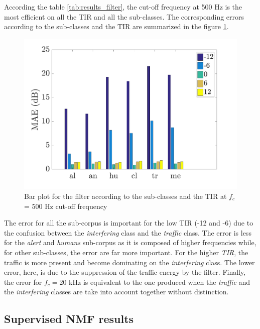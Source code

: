 \documentclass[twocolumn,a4paper,10pt]{article}
\begin{document}
According the table \ref{tab:results_filter}, the cut-off frequency at 500 Hz is the most efficient on all the TIR and all the sub-classes. The corresponding errors according to the sub-classes and the TIR are summarized in the figure \ref{fig:filterAmbiance}.\\

\begin{figure}[hbtp]
\centering
\includegraphics[width=\linewidth]{../image/AmbianceFilter.pdf}
\caption{Bar plot for the filter according to the sub-classes and the TIR at $f_c$ = 500 Hz cut-off frequency}
\label{fig:filterAmbiance}
\end{figure}

The error for all the sub-corpus is important for the low TIR (-12 and -6) due to the confusion between the \textit{interfering} class and the \textit{traffic} class. The error is less for the \textit{alert} and \textit{humans} sub-corpus as it is composed of higher frequencies while, for other sub-classes, the error are far more important. For the higher \textit{TIR}, the traffic is more present and become dominating on the \textit{interfering} class. The lower error, here, is due to the suppression of the traffic energy by the filter. Finally, the error for $f_c = 20$ kHz is equivalent to the one produced when the \textit{traffic} and the \textit{interfering} classes are take into account together without distinction.

\subsection{Supervised NMF results}
\end{document}
